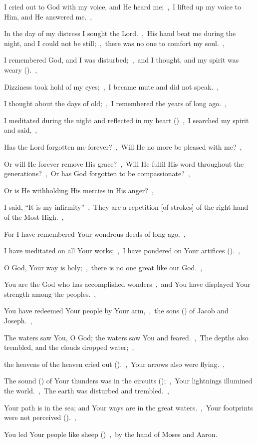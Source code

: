 \documentclass[12pt,twoside,a5paper]{article}
\begin{document}
\begin{halfparskip}
   I cried out to God with my voice, and He heard me;~\sep\ I lifted up my voice to Him, and He answered me.~\sep

  In the day of my distress I sought the Lord.~\sep\ His hand beat me during the night, and I could not be still;~\sep\ there was no one to comfort my soul.~\sep

  I remembered God, and I was disturbed;~\sep\ and I thought, and my spirit was weary ().~\sep

  Dizziness took hold of my eyes;~\sep\ I became mute and did not speak.~\sep

  I thought about the days of old;~\sep\ I remembered the years of long ago.~\sep

  I meditated during the night and reflected in my heart ()~\sep\ I searched my spirit and said,~\sep

  Has the Lord forgotten me forever?~\sep\ Will He no more be pleased with me?~\sep

  Or will He forever remove His grace?~\sep\ Will He fulfil His word throughout the generations?~\sep\ Or has God forgotten to be compassionate?~\sep

  Or is He withholding His mercies in His anger?~\sep

  I said, ``It is my infirmity''~\sep\ They are a repetition [of strokes] of the right hand of the Most High.~\sep

  For I have remembered Your wondrous deeds of long ago.~\sep

  I have meditated on all Your works;~\sep\ I have pondered on Your artifices ().~\sep

  O God, Your way is holy;~\sep\ there is no one great like our God.~\sep

  You are the God who has accomplished wonders~\sep\ and You have displayed Your strength among the peoples.~\sep

  You have redeemed Your people by Your arm,~\sep\ the sons () of Jacob and Joseph.~\sep

  The waters saw You, O God; the waters saw You and feared.~\sep\ The depths also trembled, and the clouds dropped water;~\sep

  the heavens of the heaven cried out ().~\sep\ Your arrows also were flying.~\sep

  The sound () of Your thunders was in the circuits ();~\sep\ Your lightnings illumined the world.~\sep\ The earth was disturbed and trembled.~\sep

  Your path is in the sea; and Your ways are in the great waters.~\sep\ Your footprints were not perceived ().~\sep

  You led Your people like sheep ()~\sep\ by the hand of Moses and Aaron.
\end{halfparskip}
\end{document}
